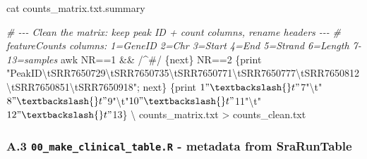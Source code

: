 \documentclass[
  11pt,
  a4paper,
]{article}
\newenvironment{Shaded}{}{}
\newcommand{\CommentTok}[1]{\textcolor[rgb]{0.38,0.63,0.69}{\textit{#1}}}
\newcommand{\DataTypeTok}[1]{\textcolor[rgb]{0.56,0.13,0.00}{#1}}
\newcommand{\FunctionTok}[1]{\textcolor[rgb]{0.02,0.16,0.49}{#1}}
\newcommand{\NormalTok}[1]{#1}
\newcommand{\OperatorTok}[1]{\textcolor[rgb]{0.40,0.40,0.40}{#1}}
\newcommand{\StringTok}[1]{\textcolor[rgb]{0.25,0.44,0.63}{#1}}
\begin{document}
\begin{Shaded}
\begin{Highlighting}[]
\FunctionTok{cat}\NormalTok{ counts\_matrix.txt.summary}

\CommentTok{\# {-}{-}{-} Clean the matrix: keep peak ID + count columns, rename headers {-}{-}{-}}
\CommentTok{\# featureCounts columns: 1=GeneID 2=Chr 3=Start 4=End 5=Strand 6=Length 7{-}13=samples}
\FunctionTok{awk} \StringTok{\textquotesingle{}NR==1 \&\& /\textasciicircum{}\#/ \{next\}}
\StringTok{     NR==2 \{print "PeakID\textbackslash{}tSRR7650729\textbackslash{}tSRR7650735\textbackslash{}tSRR7650771\textbackslash{}tSRR7650777\textbackslash{}tSRR7650812\textbackslash{}tSRR7650851\textbackslash{}tSRR7650918"; next\}}
\StringTok{     \{print $1"\textbackslash{}t"$7"\textbackslash{}t"$8"\textbackslash{}t"$9"\textbackslash{}t"$10"\textbackslash{}t"$11"\textbackslash{}t"$12"\textbackslash{}t"$13\}\textquotesingle{}} \DataTypeTok{\textbackslash{}}
\NormalTok{     counts\_matrix.txt }\OperatorTok{\textgreater{}}\NormalTok{ counts\_clean.txt}
\end{Highlighting}
\end{Shaded}

\hypertarget{a.3-00_make_clinical_table.r---metadata-from-sraruntable}{%
\subsubsection{\texorpdfstring{A.3 \texttt{00\_make\_clinical\_table.R}
- metadata from
SraRunTable}{A.3 00\_make\_clinical\_table.R - metadata from SraRunTable}}\label{a.3-00_make_clinical_table.r---metadata-from-sraruntable}}
\end{document}
